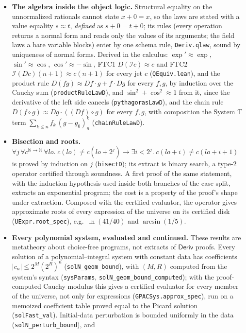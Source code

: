 \documentclass[11pt,a4paper]{article}
\theoremstyle{definition}
\theoremstyle{remark}
\newcommand{\N}{\ensuremath{\mathbb{N}}}
\newcommand{\lean}[1]{\texttt{\nolinkurl{#1}}}
\begin{document}
\begin{itemize}
\item \textbf{The algebra inside the object logic.} Structural equality on the
unnormalized rationals cannot state \(x + 0 = x\), so the laws are stated with a
value equality \(s \approx t\), \emph{defined} as \(s + 0 = t + 0\); its rules
(every operation returns a normal form and reads only the values of its
arguments; the field laws a bare variable blocks) enter by one schema rule,
\lean{Deriv.qlaw}, sound by uniqueness of normal forms. Derived in the calculus:
\(\exp' \approx \exp\), \(\sin' \approx \cos\), \(\cos' \approx -\sin\),
FTC1 \(D(\mathcal{I}c) \approx c\) and FTC2 \(\mathcal{I}(Dc)(n+1) \approx c(n+1)\)
for every jet \(c\) (\lean{QEquiv.lean}), and the product rule
\(D(fg) \approx Df\cdot g + f\cdot Dg\) for every \(f, g\), by induction over the
Cauchy sum (\lean{productRuleLawD}), and \(\sin^2+\cos^2 \approx 1\) from it, since
the derivative of the left side cancels (\lean{pythagorasLawD}), and the chain
rule \(D(f\circ g) \approx Dg\cdot((Df)\circ g)\) for every \(f, g\), with
composition the System T term \(\sum_{k\le n} f_k\,(g-g_0)^k_n\)
(\lean{chainRuleLawD}).
\item \textbf{Bisection and roots.} \(\forall j\,\forall c^{\N\to\N}\,\forall lo.\;
c(lo) \ne c(lo + 2^j) \to \exists i < 2^j.\; c(lo+i) \ne c(lo+i+1)\) is proved by
induction on \(j\) (\lean{bisectD}); its extract is binary search, a type-2
operator certified through soundness. A first proof of the same statement,
with the induction hypothesis used inside both branches of the case split,
extracts an exponential program; the cost is a property of the proof's shape
under extraction. Composed with the certified evaluator, the operator gives
approximate roots of every expression of the universe on its certified disk
(\lean{UExpr.root_spec}), e.g.\ \(\ln(41/40)\) and \(\arcsin(1/5)\).
\item \textbf{Every polynomial system, evaluated and continued.} These results
are metatheory about choice-free programs, not extracts of \(\mathsf{Deriv}\)
proofs. Every solution of a polynomial--integral system with constant data has
coefficients \(|c_n| \le 2^M (2^R)^n\) (\lean{solN_geom_bound}), with
\((M, R)\) computed from the system's syntax (\lean{sysParams},
\lean{solN_geom_bound_computed}); with the proof-computed Cauchy modulus this
gives a certified evaluator for every member of the universe, not only for
expressions (\lean{GPACSys.approx_spec}), run on a memoized coefficient table
proved equal to the Picard solution (\lean{solFast_val}). Initial-data
perturbation is bounded uniformly in the data (\lean{solN_perturb_bound}), and

\end{itemize}
\end{document}
